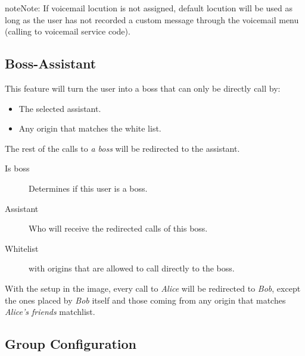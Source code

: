 \documentclass[letterpaper,10pt,english]{sphinxmanual}
\begin{document}
\begin{notice}{note}{Note:}
If voicemail locution is not assigned, default locution will be used as long as
the user has not recorded a custom message through the voicemail menu (calling to
voicemail service code).
\end{notice}


\subsection{Boss-Assistant}
\label{company/users:boss-assistant}

This feature will turn the user into a boss that can only be directly call by:
\begin{itemize}
\item {} 
The selected assistant.

\item {} 
Any origin that matches the white list.

\end{itemize}

The rest of the calls to \emph{a boss} will be redirected to the assistant.
\begin{description}
\item[{Is boss}] \leavevmode{}\label{company/users:term-is-boss}
Determines if this user is a boss.

\item[{Assistant}] \leavevmode{}\label{company/users:term-assistant}
Who will receive the redirected calls of this boss.

\item[{Whitelist}] \leavevmode{}\label{company/users:term-whitelist}
{\hyperref[company/match_lists:match\string-lists]{}} with origins that are allowed to call directly to
the boss.

\end{description}

With the setup in the image, every call to \emph{Alice} will be redirected to \emph{Bob},
except the ones placed by \emph{Bob} itself and those coming from any origin that matches
\emph{Alice's friends} matchlist.


\subsection{Group Configuration}
\label{company/users:group-configuration}
\noindent{}
\end{document}
